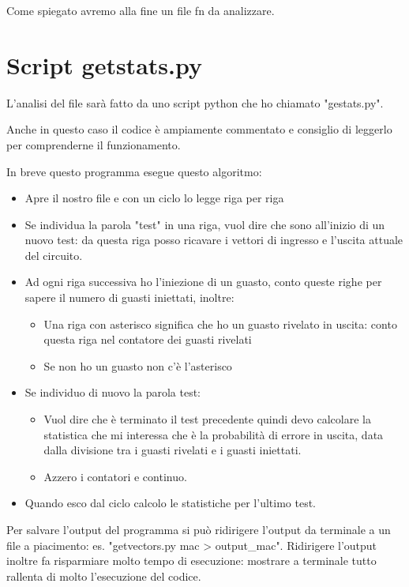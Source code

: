 \documentclass[12pt, letterpaper]{article}
\begin{document}
Come spiegato avremo alla fine un file fn da analizzare.

\section{Script getstats.py}

L'analisi del file sarà fatto da uno script python che ho chiamato "gestats.py".

Anche in questo caso il codice è ampiamente commentato e consiglio di leggerlo per comprenderne il funzionamento. 

In breve questo programma esegue questo algoritmo: 
\begin{itemize}
\item Apre il nostro file e con un ciclo lo legge riga per riga
\item Se individua la parola "test" in una riga, vuol dire che sono all'inizio di un nuovo test: da questa riga posso ricavare i vettori di ingresso e l'uscita attuale del circuito.
\item Ad ogni riga successiva ho l'iniezione di un guasto, conto queste righe per sapere il numero di guasti iniettati, inoltre:
\begin{itemize}
\item Una riga con asterisco significa che ho un guasto rivelato in uscita: conto questa riga nel contatore dei guasti rivelati
\item Se non ho un guasto non c'è l'asterisco
\end{itemize}
\item Se individuo di nuovo la parola test:
\begin{itemize}
\item Vuol dire che è terminato il test precedente quindi devo calcolare la statistica che mi interessa che è la probabilità di errore in uscita, data dalla divisione tra i guasti rivelati e i guasti iniettati.
\item Azzero i contatori e continuo.
\end{itemize}
\item Quando esco dal ciclo calcolo le statistiche per l'ultimo test.
\end{itemize}

Per salvare l'output del programma si può ridirigere l'output da terminale a un file a piacimento: es. "getvectors.py mac > output\_mac".
Ridirigere l'output inoltre fa risparmiare molto tempo di esecuzione: mostrare a terminale tutto rallenta di molto l'esecuzione del codice.
\end{document}
